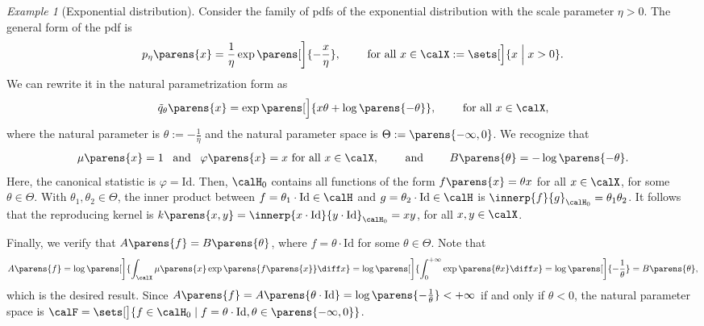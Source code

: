 \documentclass[12pt]{article}
\theoremstyle{definition}
\theoremstyle{theorem}
\theoremstyle{remark}
\newtheorem{example}{Example}
\begin{document}

\begin{example}[Exponential distribution]
	Consider the family of pdfs of the exponential distribution with the scale parameter $\eta > 0$. The general form of the pdf is 
	\begin{align*}
		p_{\eta} \parens{x} = \frac{1}{\eta} \exp \parens[\bigg]{-\frac{x}{\eta}}, \qquad \text{ for all } x \in \calX := \sets[\Big]{x \Bigm| x > 0}. 
	\end{align*}
	We can rewrite it in the natural parametrization form as 
	\begin{align}
		\tilde{q}_{\theta} \parens{x} = \exp \parens[\Big]{x \theta + \log \parens{-\theta}}, \qquad \text{ for all } x \in \calX, 
	\end{align}
	where the natural parameter is $\theta := - \frac{1}{\eta}$ and the natural parameter space is $\Theta := \parens{-\infty, 0}$. We recognize that 
	\begin{align*}
		\mu \parens{x} = 1 \enspace \text{ and } \enspace \varphi \parens{x} = x \text{ for all } x \in \calX, \qquad \text{ and } \qquad B \parens{\theta} = - \log \parens{-\theta}.  
	\end{align*}
	Here, the canonical statistic is $\varphi = \mathrm{Id}$. Then, $\calH_0$ contains all functions of the form $f \parens{x} = \theta x$ for all $x \in \calX$, for some $\theta \in \Theta$. With $\theta_1, \theta_2 \in \Theta$, the inner product between $f = \theta_1 \cdot \mathrm{Id} \in \calH$ and $g = \theta_2 \cdot \mathrm{Id} \in \calH$ is $\innerp{f}{g}_{\calH_0} = \theta_1 \theta_2$. It follows that the reproducing kernel is $k \parens{x, y} = \innerp{x \cdot \mathrm{Id}}{y \cdot \mathrm{Id}}_{\calH_0} = x y$, for all $x, y \in \calX$. 
	
	Finally, we verify that $A \parens{f} = B \parens{\theta}$, where $f = \theta \cdot \mathrm{Id}$ for some $\theta \in \Theta$. Note that 
	\begin{align*}
		A \parens{f} = \log \parens[\bigg]{\int_{\calX} \mu \parens{x} \exp \parens{f \parens{x}} \diff x} 
		= \log \parens[\bigg]{\int_{0}^{+\infty} \exp \parens{\theta x} \diff x} = \log \parens[\bigg]{-\frac{1}{\theta}} = B \parens{\theta}, 
	\end{align*}
	which is the desired result. Since $A \parens{f} = A \parens{\theta \cdot \mathrm{Id}} = \log \parens{-\frac{1}{\theta}} < + \infty$ if and only if $\theta < 0$, the natural parameter space is $\calF = \sets[\big]{f \in \calH_0 \mid f = \theta \cdot \mathrm{Id}, \theta \in \parens{-\infty, 0} }$. 
\end{example}
\end{document}
